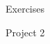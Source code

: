 \documentclass{beamer}
\begin{document}
\begin{frame}{Exercises}
    \begin{block}{Project 2}
    \end{block}
\end{frame}

%
%
\end{document}
